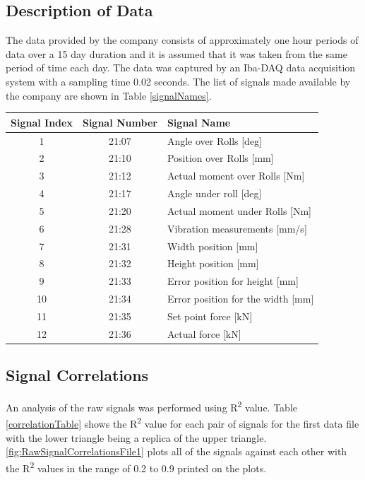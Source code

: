 \documentclass[]{article}
\begin{document}
\subsection{Description of Data}
The data provided by the company consists of approximately one hour periods of data over a 15 day duration and it is assumed that it was taken from the same period of time each day. The data was captured by an Iba-DAQ data acquisition system with a sampling time 0.02 seconds. The list of signals made available by the company are shown in Table \ref{signalNames}.
\begin{center}
\label{signalNames}
\begin{tabular}{ |c|c|l| }
 \hline
Signal Index & Signal Number & Signal Name \\ 
 \hline
1 & 21:07 & Angle over Rolls [deg] \\
 \hline
2 & 21:10 & Position over Rolls [mm] \\
 \hline
3 & 21:12 & Actual moment over Rolls [Nm] \\
 \hline
4 & 21:17 & Angle under roll [deg] \\
 \hline
5 & 21:20 & Actual moment under Rolls [Nm] \\
 \hline
6 & 21:28 & Vibration measurements [mm/s] \\ 
 \hline              
7 & 21:31 & Width position [mm] \\
 \hline
8 & 21:32 & Height position [mm] \\
 \hline
9 & 21:33 & Error position for height [mm] \\
 \hline
10 & 21:34 & Error position for the width [mm] \\
 \hline
11 & 21:35 & Set point force [kN] \\
 \hline
12 & 21:36 & Actual force [kN] \\
 \hline
\end{tabular}
\end{center}

\subsection{Signal Correlations}
An analysis of the raw signals was performed using R\textsuperscript{2} value. Table \ref{correlationTable} shows the R\textsuperscript{2} value for each pair of signals for the first data file with the lower triangle being a replica of the upper triangle.\cref{fig:RawSignalCorrelationsFile1} plots all of the signals against each other with the R\textsuperscript{2} values in the range of 0.2 to 0.9 printed on the plots. 
\end{document}
